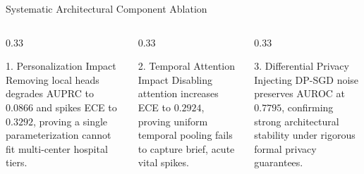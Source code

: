\documentclass[aspectratio=169, 10pt]{beamer}
\begin{document}
\begin{frame}{Systematic Architectural Component Ablation}
    \begin{columns}[t]
        \begin{column}{0.33\textwidth}
            \begin{block}{1. Personalization Impact}
                \tiny
                Removing local heads degrades AUPRC to $0.0866$ and spikes ECE to $0.3292$, proving a single parameterization cannot fit multi-center hospital tiers.
            \end{block}
        \end{column}
        \begin{column}{0.33\textwidth}
            \begin{alertblock}{2. Temporal Attention Impact}
                \tiny
                Disabling attention increases ECE to $0.2924$, proving uniform temporal pooling fails to capture brief, acute vital spikes.
            \end{alertblock}
        \end{column}
        \begin{column}{0.33\textwidth}
            \begin{exampleblock}{3. Differential Privacy}
                \tiny
                Injecting DP-SGD noise preserves AUROC at $0.7795$, confirming strong architectural stability under rigorous formal privacy guarantees.
            \end{exampleblock}
        \end{column}
    \end{columns}
\end{frame}
\end{document}
